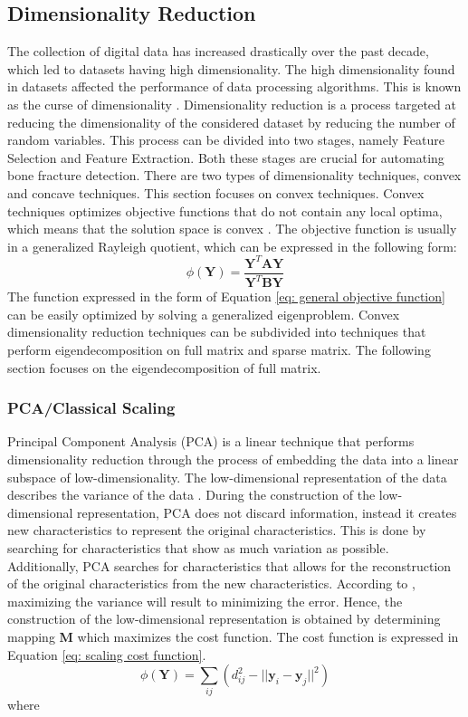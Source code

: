 \documentclass[11pt,twocolumn]{witseiepaper}
\begin{document}
	\subsection{Dimensionality Reduction}
	The collection of digital data has increased drastically over the past decade, which led to datasets having high dimensionality. The high dimensionality found in datasets affected the performance of data processing algorithms. This is known as the curse of dimensionality \cite{Center2002}. Dimensionality reduction is a process targeted at reducing the dimensionality of the considered dataset by reducing the number of random variables. This process can be divided into two stages, namely Feature Selection and Feature Extraction. Both these stages are crucial for automating bone fracture detection. There are two types of dimensionality techniques, convex and concave techniques. This section focuses on convex techniques. Convex techniques optimizes objective functions that do not contain any local optima, which means that the solution space is convex \cite{Boyd2010}. The objective function is usually in a generalized Rayleigh quotient, which can be expressed in the following form: 
	\begin{equation}
	\phi(\textbf{Y}) = \frac{\textbf{Y}^{T}\textbf{AY}}{\textbf{Y}^{T}\textbf{BY}}
	\label{eq: general objective function}
	\end{equation}
	The function expressed in the form of Equation \ref{eq: general objective function} can be easily optimized by solving a generalized eigenproblem. Convex dimensionality reduction techniques can be subdivided into techniques that perform eigendecomposition on full matrix and sparse matrix. The following section focuses on the eigendecomposition of full matrix. 
	
	\subsubsection{PCA/Classical Scaling}
	Principal Component Analysis (PCA) is a linear technique that performs dimensionality reduction through the process of embedding the data into a linear subspace of low-dimensionality. The low-dimensional representation of the data describes the variance of the data \cite{Jolliffe2016}. During the construction of the low-dimensional representation, PCA does not discard information, instead it creates new characteristics to represent the original characteristics. This is done by searching for characteristics that show as much variation as possible. Additionally, PCA searches for characteristics that allows for the reconstruction of the original characteristics from the new characteristics. According to \cite{van2009dimensionality}, maximizing the variance will result to minimizing the error. Hence, the construction of the low-dimensional representation is obtained by determining mapping  \textbf{M} which maximizes the cost function. The cost function is expressed in Equation \ref{eq: scaling cost function}.
	\begin{equation}
	\phi(\textbf{Y}) = \sum_{ij}(d_{ij}^{2} - ||\textbf{y}_i - \textbf{y}_j||^2)
	\label{eq: scaling cost function}
	\end{equation}
	where 
	
\end{document}
